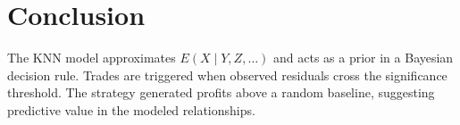\documentclass{article}
\begin{document}
\section{Conclusion}
The KNN model approximates $E(X\mid Y,Z,\ldots)$ and acts as a prior in a Bayesian decision rule. Trades are triggered when observed residuals cross the significance threshold. The strategy generated profits above a random baseline, suggesting predictive value in the modeled relationships.
\end{document}
